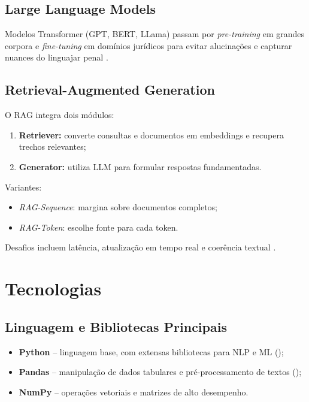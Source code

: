 \section{Large Language Models}
Modelos Transformer (GPT, BERT, LLama) passam por \emph{pre-training} em grandes corpora e \emph{fine-tuning} em domínios jurídicos para evitar alucinações e capturar nuances do linguajar penal \cite{vaswani2017attention,naveeda2024comprehensive}.

\section{Retrieval-Augmented Generation}
O RAG integra dois módulos:
\begin{enumerate}[label=\arabic*.]
  \item \textbf{Retriever:} converte consultas e documentos em embeddings e recupera trechos relevantes;
  \item \textbf{Generator:} utiliza LLM para formular respostas fundamentadas.
\end{enumerate}

Variantes:
\begin{itemize}[label=\textbullet]
  \item \emph{RAG-Sequence}: margina sobre documentos completos;
  \item \emph{RAG-Token}: escolhe fonte para cada token.
\end{itemize}

Desafios incluem latência, atualização em tempo real e coerência textual \cite{saleافغان미}.


\chapter{Tecnologias}
\label{chap:tecnologias}

\section{Linguagem e Bibliotecas Principais}
\begin{itemize}[label=\textbullet]
  \item \textbf{Python} – linguagem base, com extensas bibliotecas para NLP e ML (\cite{python2024});
  \item \textbf{Pandas} – manipulação de dados tabulares e pré-processamento de textos (\cite{pandas2024});
  \item \textbf{NumPy} – operações vetoriais e matrizes de alto desempenho.
\end{itemize}

